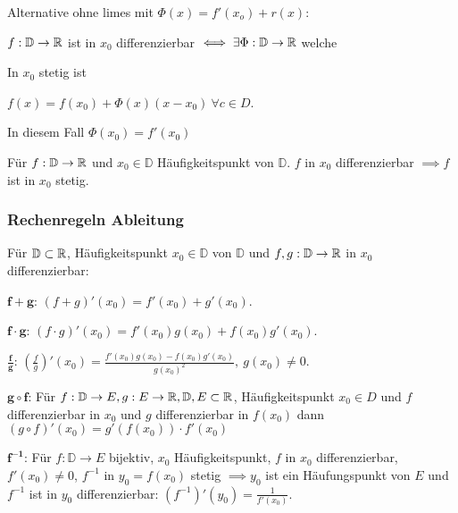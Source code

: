 Alternative ohne limes mit $\Phi(x) = f'(x_o) + r(x)$:
\begin{compactitem}
    \item $f: \mathbb{D} \to \mathbb{R}$ ist in $x_0$ differenzierbar $\iff \exists \Phi: \mathbb{D} \to \mathbb{R}$ welche
        \begin{inparaenum}
            \item In $x_0$ stetig ist
            \item $f(x) = f(x_0) + \Phi(x)(x - x_0) \ \forall c \in D$.
        \end{inparaenum}
        \begin{compactitem}
        \item In diesem Fall $\Phi(x_0) = f'(x_0)$
        \end{compactitem}
\end{compactitem}
\begin{compactitem}
    \item Für $f: \mathbb{D} \to \mathbb{R}$ und $x_0 \in \mathbb{D}$ Häufigkeitspunkt von $\mathbb{D}$. $f$ in $x_0$ differenzierbar $\implies f$ ist in $x_0$ stetig.
\end{compactitem}


\subsubsection{Rechenregeln Ableitung}
Für $\mathbb{D} \subset \mathbb{R}$, Häufigkeitspunkt $x_0 \in \mathbb{D}$ von $\mathbb{D}$ und $f,g: \mathbb{D} \to \mathbb{R}$ in $x_0$ differenzierbar:
\begin{compactdesc}
    \item[$\mathbf{f + g}$:] $(f + g)'(x_0) = f'(x_0) + g'(x_0)$.
    \item[$\mathbf{f \cdot g}$:] $(f \cdot g)'(x_0) = f'(x_0)g(x_0) + f(x_0)g'(x_0)$.
    \item[$\mathbf{\frac{f}{g}}$:] $\left( \frac{f}{g} \right)' (x_0) = \frac{f'(x_0)g(x_0) - f(x_0)g'(x_0)}{g(x_0)^2}, \ g(x_0) \neq 0$.
    \item[$\mathbf{g \circ f}$:] Für $f: \mathbb{D} \to E, g: E \to \mathbb{R}, \mathbb{D}, E \subset \mathbb{R}$, Häufigkeitspunkt $x_0 \in D$ und $f$ differenzierbar in $x_0$ und $g$ differenzierbar in $f(x_0)$ dann $(g \circ f)'(x_0) = g'(f(x_0)) \cdot f'(x_0)$
    \item[$\mathbf{f^{-1}}$:] Für $f:\mathbb{D} \to E$ bijektiv, $x_0$ Häufigkeitspunkt, $f$ in $x_0$ differenzierbar, $f'(x_0) \neq 0$, $f^{-1}$ in $y_0 = f(x_0)$ stetig $\implies y_0$ ist ein Häufungspunkt von $E$ und $f^{-1}$ ist in $y_0$ differenzierbar: $(f^{-1})'(y_0) = \frac{1}{f'(x_0)}$.
\end{compactdesc}

